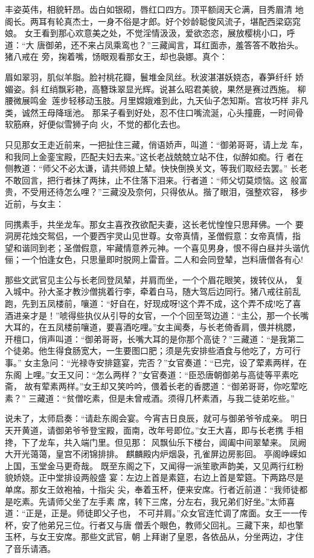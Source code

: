丰姿英伟，相貌轩昂。齿白如银砌，唇红口四方。顶平额阔天仑满，目秀眉清
地阁长。两耳有轮真杰士，一身不俗是才郎。好个妙龄聪俊风流子，堪配西梁窈窕
娘。
女王看到那心欢意美之处，不觉淫情汲汲，爱欲恣恣，展放樱桃小口，呼道：“大
唐御弟，还不来占凤乘鸾也？”三藏闻言，耳红面赤，羞答答不敢抬头。猪八戒在
旁，掬着嘴，饧眼观看那女王，却也袅娜。真个：

眉如翠羽，肌似羊脂。脸衬桃花瓣，鬟堆金凤丝。秋波湛湛妖娆态，春笋纤纤
娇媚姿。斜红绡飘彩艳，高簪珠翠显光辉。说甚么昭君美貌，果然是赛过西施。
柳腰微展鸣金，莲步轻移动玉肢。月里嫦娥难到此，九天仙子怎知斯。宫妆巧样
非凡类，诚然王母降瑶池。
那呆子看到好处，忍不住口嘴流涎，心头撞鹿，一时间骨软筋麻，好便似雪狮子向
火，不觉的都化去也。

只见那女王走近前来，一把扯住三藏，俏语娇声，叫道：“御弟哥哥，请上龙
车，和我同上金銮宝殿，匹配夫妇去来。”这长老战兢兢立站不住，似醉如痴。行
者在侧教道：“师父不必太谦，请共师娘上辇。快快倒换关文，等我们取经去罢。”
长老不敢回言，把行者抹了两抹，止不住落下泪来。行者道：“师父切莫烦恼。这
般富贵，不受用还待怎么哩？”三藏没及奈何，只得依从。揩了眼泪，强整欢容，
移步近前，与女主：

同携素手，共坐龙车。那女主喜孜孜欲配夫妻，这长老忧惶惶只思拜佛。一个
要洞房花烛交鸳侣，一个要西宇灵山见世尊。女帝真情，圣僧假意：女帝真情，指
望和谐同到老；圣僧假意，牢藏情意养元神。一个喜见男身，恨不得白昼并头谐伉
俪；一个怕逢女色，只思量即时脱网上雷音。二人和会同登辇，岂料唐僧各有心!

那些文武官见主公与长老同登凤辇，并肩而坐，一个个眉花眼笑，拨转仪从，
复入城中。孙大圣才教沙僧挑着行李，牵着白马，随大驾后边同行。猪八戒往前乱
跑，先到五凤楼前，嚷道：“好自在，好现成呀!这个弄不成，这个弄不成!吃了喜
酒进亲才是！”唬得些执仪从引导的女官，一个个回至驾边道：“主公，那一个长嘴
大耳的，在五凤楼前嚷道，要喜酒吃哩。”女主闻奏，与长老倚香肩，偎并桃腮，
开檀口，俏声叫道：“御弟哥哥，长嘴大耳的是你那个高徒？”三藏道：“是我第二
个徒弟。他生得食肠宽大，一生要图口肥；须是先安排些酒食与他吃了，方可行事。”
女主急问：“光禄寺安排筵宴，完否？”女官奏道：“已完，设了荤素两样，在东阁
上哩。”女王又问：“怎么两样？”女官奏道：“臣恐唐朝御弟与高徒等平素吃斋，
故有荤素两样。”女王却又笑吟吟，偎着长老的香腮道：“御弟哥哥，你吃荤吃素？”
三藏道：“贫僧吃素，但是未曾戒酒。须得几杯素酒，与我二徒弟吃些。”

说未了，太师启奏：“请赴东阁会宴。今宵吉日良辰，就可与御弟爷爷成亲。
明日天开黄道，请御弟爷爷登宝殿，面南，改年号即位。”女王大喜，即与长老携
手相搀，下了龙车，共入端门里。但见那：
风飘仙乐下楼台，阊阖中间翠辇来。
凤阙大开光蔼蔼，皇宫不闭锦排排。
麒麟殿内炉烟袅，孔雀屏边房影回。
亭阁峥嵘如上国，玉堂金马更奇哉。
既至东阁之下，又闻得一派笙歌声韵美，又见两行红粉貌娇娆。正中堂排设两般盛
宴：左边上首是素筵，右边上首是荤筵。下两路尽是单席。那女王敛袍袖，十指尖
尖，奉着玉杯，便来安席。行者近前道：“我师徒都是吃素。先请师父坐了左手素
席，转下三席，分左右，我兄弟们好坐。”太师喜道：“正是，正是。师徒即父子也，
不可并肩。”众女官连忙调了席面。女王一一传杯，安了他弟兄三位。行者又与唐
僧丢个眼色，教师父回礼。三藏下来，却也擎玉杯，与女王安席。那些文武官，朝
上拜谢了皇恩，各依品从，分坐两边，才住了音乐请酒。


